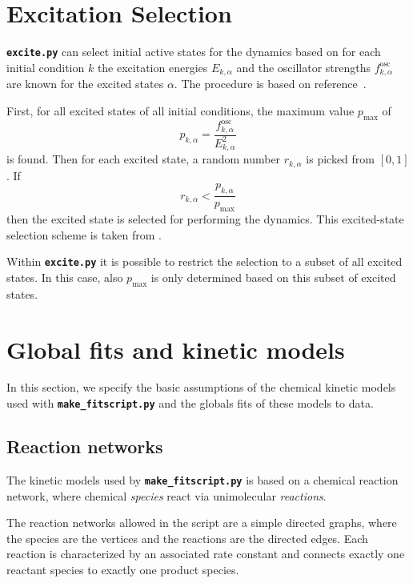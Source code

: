 \documentclass[a4paper,11pt,DIV=15,openany,twoside=false]{scrbook}
\newcommand{\ttt}[1]{\textbf{\texttt{#1}}}
\begin{document}
\section{Excitation Selection}\label{met:exc_selection}

\ttt{excite.py} can select initial active states for the dynamics based on for each initial condition $k$ the excitation energies $E_{k,\alpha}$ and the oscillator strengths $f^{\text{osc}}_{k,\alpha}$ are known for the excited states $\alpha$. The procedure is based on reference~\cite{Barbatti2011}.

First, for all excited states of all initial conditions, the maximum value $p_{\text{max}}$ of 
\begin{equation}
  p_{k,\alpha}=\frac{f^{\text{osc}}_{k,\alpha}}{E_{k,\alpha}^2} \label{eq:exc_prob}
\end{equation}
is found. Then for each excited state, a random number $r_{k,\alpha}$ is picked from $[0,1]$. If
\begin{equation}
  r_{k,\alpha}<\frac{p_{k,\alpha}}{p_{\text{max}}}
\end{equation}
then the excited state is selected for performing the dynamics. This excited-state selection scheme is taken from \cite{Barbatti2011}.

Within \ttt{excite.py} it is possible to restrict the selection to a subset of all excited states. In this case, also $p_{\text{max}}$ is only determined based on this subset of excited states.


\section{Global fits and kinetic models}\label{met:globalfit}

In this section, we specify the basic assumptions of the chemical kinetic models used with \ttt{make\_fitscript.py} and the globals fits of these models to data.

\subsection{Reaction networks}

The kinetic models used by \ttt{make\_fitscript.py} is based on a chemical reaction network, where chemical \textit{species} react via unimolecular \textit{reactions}.

The reaction networks allowed in the script are a simple directed graphs, where the species are the vertices and the reactions are the directed edges.
Each reaction is characterized by an associated rate constant and connects exactly one reactant species to exactly one product species.
\end{document}
